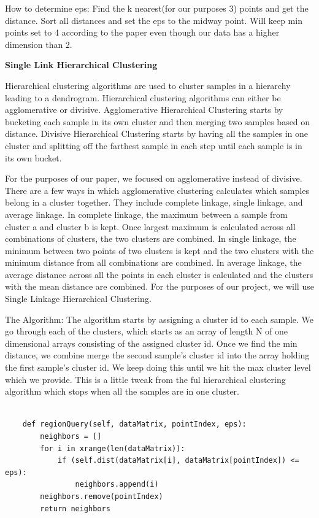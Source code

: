 \documentclass[12pt]{article}
\begin{document}
\begin{enumerate}
How to determine eps:
Find the k nearest(for our purposes 3) points and get the distance. Sort all distances and set the eps to the midway point. Will keep min points set to 4 according to the paper even though our data has a higher dimension than 2.

\textbf{Single Link Hierarchical Clustering}

Hierarchical clustering algorithms are used to cluster samples in a hierarchy leading to a dendrogram. Hierarchical clustering algorithms can either be agglomerative or divisive. Agglomerative Hierarchical Clustering starts by bucketing each sample in its own cluster and then merging two samples based on distance. Divisive Hierarchical Clustering starts by having all the samples in one cluster and splitting off the farthest sample in each step until each sample is in its own bucket.

For the purposes of our paper, we focused on agglomerative instead of divisive.  There are a few ways in which agglomerative clustering calculates which samples belong in a cluster together. They include complete linkage, single linkage, and average linkage. In complete linkage, the maximum between a sample from cluster a and cluster b is kept. Once largest maximum is calculated across all combinations of clusters, the two clusters are combined. In single linkage, the minimum between two points of two clusters is kept and the two clusters with the minimum distance from all combinations are combined. In average linkage, the average distance across all the points in each cluster is calculated and the clusters with the mean distance are combined. For the purposes of our project, we will use Single Linkage Hierarchical Clustering.

The Algorithm:
The algorithm starts by assigning a cluster id to each sample. We go through each of the clusters, which starts as an array of length N of one dimensional arrays consisting of the assigned cluster id. Once we find the min distance, we combine merge the second sample’s cluster id into the array holding the first sample’s cluster id. We keep doing this until we hit the max cluster level which we provide. This is a little tweak from the ful hierarchical clustering algorithm which stops when all the samples are in one cluster.

\begin{verbatim}

    def regionQuery(self, dataMatrix, pointIndex, eps):
        neighbors = []
        for i in xrange(len(dataMatrix)):
            if (self.dist(dataMatrix[i], dataMatrix[pointIndex]) <= eps):
                neighbors.append(i)
        neighbors.remove(pointIndex)
        return neighbors


\end{verbatim}
\end{enumerate}
\end{document}
